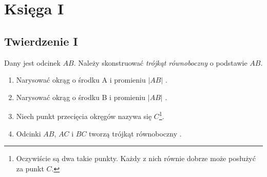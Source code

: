 \documentclass[12pt, a4paper]{article}
\begin{document}
\pagebreak

\section*{Księga I}
\subsection*{Twierdzenie I}

Dany jest odcinek $AB$. Należy skonstruować \emph{trójkąt równoboczny} o
podstawie $AB$.

\begin{figure}[h!]
    \begin{center}
    \end{center}
\end{figure}

\begin{enumerate}
    \item Narysować okrąg o środku A i promieniu $|AB|$ .
    \item Narysować okrąg o środku B i promieniu $|AB|$ .
    \item Niech punkt przecięcia okręgów nazywa się $C$\footnote{
        Oczywiście są dwa takie punkty. Każdy z nich równie dobrze może posłużyć
        za punkt $C$.
    }.
    \item Odcinki $AB$, $AC$ i $BC$ tworzą trójkąt równoboczny .
\end{enumerate}

\end{document}
